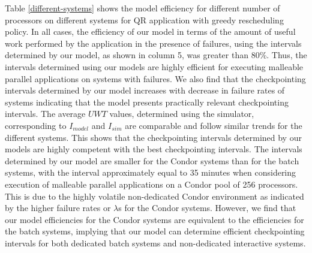 \documentclass[conference,10pt]{IEEEtran}
\begin{document}
Table \ref{different-systems} shows the model efficiency for different
number of processors on different systems for QR application with greedy rescheduling
policy. In all cases, the efficiency of our model in terms of the
amount of useful work performed by the application in the presence of
failures, using the intervals determined by our model, as shown
in column 5, was greater than 80\%. Thus, the intervals determined
using our models are highly efficient for executing malleable parallel
applications on systems with failures. We also find that the
checkpointing intervals determined by our model increases with
decrease in failure rates of systems indicating that the model
presents practically relevant checkpointing intervals. The average
$UWT$ values, determined using the simulator, corresponding to
$I_{model}$ and $I_{sim}$ are comparable and follow similar trends for
the different systems. This shows that the checkpointing intervals
determined by our models are highly competent with the best
checkpointing intervals. The intervals determined by our model are
smaller for the Condor systems than for the batch systems, with the
interval approximately equal to 35 minutes when considering execution
of malleable parallel applications on a Condor pool of 256
processors. This is due to the highly volatile non-dedicated Condor
environment as indicated by the higher failure rates or $\lambda$s for
the Condor systems. However, we find that our model
efficiencies for the Condor systems are equivalent to the
efficiencies for the batch systems, implying that our model can
determine efficient checkpointing intervals for both dedicated batch
systems and non-dedicated interactive systems.
\end{document}
